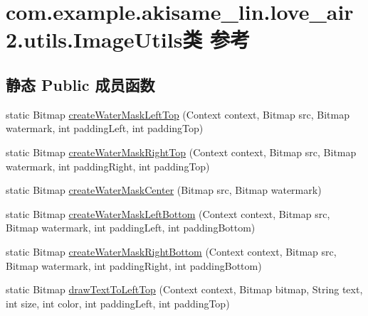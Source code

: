 \hypertarget{classcom_1_1example_1_1akisame__lin_1_1love__air2_1_1utils_1_1_image_utils}{}\section{com.\+example.\+akisame\+\_\+lin.\+love\+\_\+air2.\+utils.\+Image\+Utils类 参考}
\label{classcom_1_1example_1_1akisame__lin_1_1love__air2_1_1utils_1_1_image_utils}
\subsection*{静态 Public 成员函数}
\begin{DoxyCompactItemize}
\item 
static Bitmap \mbox{\hyperlink{classcom_1_1example_1_1akisame__lin_1_1love__air2_1_1utils_1_1_image_utils_a6d409a73cd03e5129f0885ac3f1f2223}{create\+Water\+Mask\+Left\+Top}} (Context context, Bitmap src, Bitmap watermark, int padding\+Left, int padding\+Top)
\item 
static Bitmap \mbox{\hyperlink{classcom_1_1example_1_1akisame__lin_1_1love__air2_1_1utils_1_1_image_utils_ac86b4fa54648b21152a29727aa2c1b2d}{create\+Water\+Mask\+Right\+Top}} (Context context, Bitmap src, Bitmap watermark, int padding\+Right, int padding\+Top)
\item 
static Bitmap \mbox{\hyperlink{classcom_1_1example_1_1akisame__lin_1_1love__air2_1_1utils_1_1_image_utils_a08e7ead8c415c054072c6dd0395f4bbc}{create\+Water\+Mask\+Center}} (Bitmap src, Bitmap watermark)
\item 
static Bitmap \mbox{\hyperlink{classcom_1_1example_1_1akisame__lin_1_1love__air2_1_1utils_1_1_image_utils_a4de8a3361e482664f5b2c38d73484370}{create\+Water\+Mask\+Left\+Bottom}} (Context context, Bitmap src, Bitmap watermark, int padding\+Left, int padding\+Bottom)
\item 
static Bitmap \mbox{\hyperlink{classcom_1_1example_1_1akisame__lin_1_1love__air2_1_1utils_1_1_image_utils_a06e01f63d46bba8b15d9779bccc176d1}{create\+Water\+Mask\+Right\+Bottom}} (Context context, Bitmap src, Bitmap watermark, int padding\+Right, int padding\+Bottom)
\item 
static Bitmap \mbox{\hyperlink{classcom_1_1example_1_1akisame__lin_1_1love__air2_1_1utils_1_1_image_utils_a9db72e957ae1387ccaa1fd09b8af2516}{draw\+Text\+To\+Left\+Top}} (Context context, Bitmap bitmap, String text, int size, int color, int padding\+Left, int padding\+Top)

\end{DoxyCompactItemize}
